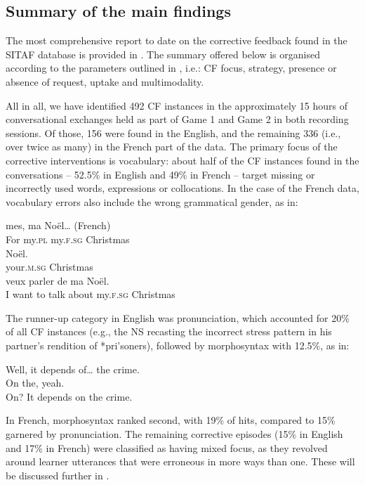 \documentclass[output=paper,colorlinks,citecolor=brown,modfonts,nonflat]{../langscibook}
\begin{document}
\subsection{Summary of the main findings}\label{sec:scheuer:4.2}

The most comprehensive report to date on the corrective feedback found in the SITAF database is provided in \citet{ScheuerHorgues2020}. The summary offered below is organised according to the parameters outlined in , i.e.: CF focus, strategy, presence or absence of request, uptake and multimodality.

All in all, we have identified 492 CF instances in the approximately 15 hours of conversational exchanges held as part of Game 1 and Game 2 in both recording sessions. Of those, 156 were found in the English, and the remaining 336 (i.e., over twice as many) in the French part of the data. The primary focus of the corrective interventions is vocabulary: about half of the CF instances found in the conversations – 52.5\% in English and 49\% in French – target missing or incorrectly used words, expressions or collocations. In the case of the French data, vocabulary errors also include the wrong grammatical gender, as in:

\ea\label{ex:scheuer:6}
{\NNS}
 {mes,}    {ma}    {Noël…}   (French)\\
      For my.\textsc{pl}    my.\textsc{f.sg}  Christmas\\

{\NS}
    {Noël.}\\
your{}.\textsc{m.sg}    Christmas\\

{\NNS}
 {veux} {parler} {de}  {ma}     {Noël.}\\
I want to talk about    my.\textsc{f.sg}  Christmas\\
\z

The runner-up category in English was pronunciation, which accounted for 20\% of all CF instances (e.g., the NS recasting the incorrect stress pattern in his partner’s rendition of *pri'soners), followed by morphosyntax with 12.5\%, as in:

\ea\label{ex:scheuer:7}
{\NNS} {Well,} {it} {depends} {of…} {the} {crime.}\\
{\NS} {On} {the,} {yeah.}\\
{\NNS} {On?} {It} {depends} {on} {the} {crime.}
\z

In French, morphosyntax ranked second, with 19\% of hits, compared to 15\% garnered by pronunciation. The remaining corrective episodes (15\% in English and 17\% in French) were classified as having mixed focus, as they revolved around learner utterances that were erroneous in more ways than one. These will be discussed further in . 
\end{document}
